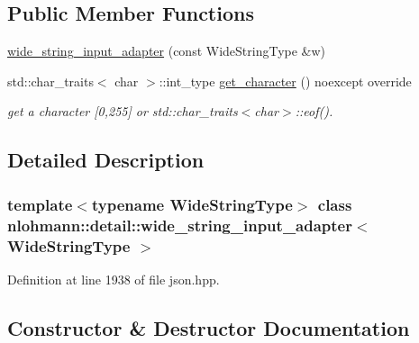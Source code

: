 \subsection*{Public Member Functions}
\begin{DoxyCompactItemize}
\item 
\hyperlink{classnlohmann_1_1detail_1_1wide__string__input__adapter_af866541e8cc492cc565dbe68c0c72ea2}{wide\+\_\+string\+\_\+input\+\_\+adapter} (const Wide\+String\+Type \&w)
\item 
std\+::char\+\_\+traits$<$ char $>$\+::int\+\_\+type \hyperlink{classnlohmann_1_1detail_1_1wide__string__input__adapter_abb62b34cf77e557ce5321b7f2490c3b0}{get\+\_\+character} () noexcept override
\begin{DoxyCompactList}\small\item\em get a character \mbox{[}0,255\mbox{]} or std\+::char\+\_\+traits$<$char$>$\+::eof(). \end{DoxyCompactList}\end{DoxyCompactItemize}


\subsection{Detailed Description}
\subsubsection*{template$<$typename Wide\+String\+Type$>$\newline
class nlohmann\+::detail\+::wide\+\_\+string\+\_\+input\+\_\+adapter$<$ Wide\+String\+Type $>$}



Definition at line 1938 of file json.\+hpp.



\subsection{Constructor \& Destructor Documentation}
\mbox{\label{classnlohmann_1_1detail_1_1wide__string__input__adapter_af866541e8cc492cc565dbe68c0c72ea2}} 
